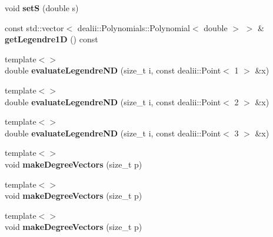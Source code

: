 \begin{DoxyCompactItemize}
\item 
\hypertarget{classnatrium_1_1NewFilter_a7806f03494544d011d60788de497db2f}{
void {\bfseries setS} (double s)}
\label{classnatrium_1_1NewFilter_a7806f03494544d011d60788de497db2f}

\item 
\hypertarget{classnatrium_1_1NewFilter_a08cf711ca2c7671c5c35aa8045a0274e}{
const std::vector$<$ dealii::Polynomials::Polynomial$<$ double $>$ $>$ \& {\bfseries getLegendre1D} () const }
\label{classnatrium_1_1NewFilter_a08cf711ca2c7671c5c35aa8045a0274e}

\item 
\hypertarget{classnatrium_1_1NewFilter_acad32702d7d53cfe52961363043e3e34}{
{\footnotesize template$<$$>$ }\\double {\bfseries evaluateLegendreND} (size\_\-t i, const dealii::Point$<$ 1 $>$ \&x)}
\label{classnatrium_1_1NewFilter_acad32702d7d53cfe52961363043e3e34}

\item 
\hypertarget{classnatrium_1_1NewFilter_a1870dd3c571a62174c334421b83f7aa1}{
{\footnotesize template$<$$>$ }\\double {\bfseries evaluateLegendreND} (size\_\-t i, const dealii::Point$<$ 2 $>$ \&x)}
\label{classnatrium_1_1NewFilter_a1870dd3c571a62174c334421b83f7aa1}

\item 
\hypertarget{classnatrium_1_1NewFilter_a68443209e58c4fbe6b4a74d4391a16d7}{
{\footnotesize template$<$$>$ }\\double {\bfseries evaluateLegendreND} (size\_\-t i, const dealii::Point$<$ 3 $>$ \&x)}
\label{classnatrium_1_1NewFilter_a68443209e58c4fbe6b4a74d4391a16d7}

\item 
\hypertarget{classnatrium_1_1NewFilter_af0c7da64b0a485b526175021644ba520}{
{\footnotesize template$<$$>$ }\\void {\bfseries makeDegreeVectors} (size\_\-t p)}
\label{classnatrium_1_1NewFilter_af0c7da64b0a485b526175021644ba520}

\item 
\hypertarget{classnatrium_1_1NewFilter_ae325ca249a1732b87301ae9ff8ca1ccd}{
{\footnotesize template$<$$>$ }\\void {\bfseries makeDegreeVectors} (size\_\-t p)}
\label{classnatrium_1_1NewFilter_ae325ca249a1732b87301ae9ff8ca1ccd}

\item 
\hypertarget{classnatrium_1_1NewFilter_a0f91122ee3ebc5c3b089a4f0c3484990}{
{\footnotesize template$<$$>$ }\\void {\bfseries makeDegreeVectors} (size\_\-t p)}
\label{classnatrium_1_1NewFilter_a0f91122ee3ebc5c3b089a4f0c3484990}

\end{DoxyCompactItemize}

